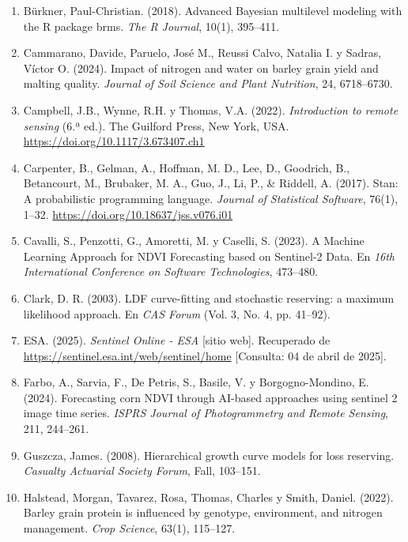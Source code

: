 \documentclass[
11pt, %
]{charter}
\begin{document}
\begin{enumerate}
    \item Bürkner, Paul-Christian. (2018). Advanced Bayesian multilevel modeling with the R package brms. \emph{The R Journal}, 10(1), 395–411.

    \item Cammarano, Davide, Paruelo, José M., Reussi Calvo, Natalia I. y Sadras, Víctor O. (2024). Impact of nitrogen and water on barley grain yield and malting quality. \emph{Journal of Soil Science and Plant Nutrition}, 24, 6718–6730.

    \item Campbell, J.B., Wynne, R.H. y Thomas, V.A. (2022). \emph{Introduction to remote sensing} (6.ª ed.). The Guilford Press, New York, USA. \url{https://doi.org/10.1117/3.673407.ch1}

    \item Carpenter, B., Gelman, A., Hoffman, M. D., Lee, D., Goodrich, B., Betancourt, M., Brubaker, M. A., Guo, J., Li, P., \& Riddell, A. (2017). Stan: A probabilistic programming language. \emph{Journal of Statistical Software}, 76(1), 1–32. \url{https://doi.org/10.18637/jss.v076.i01}

    \item Cavalli, S., Penzotti, G., Amoretti, M. y Caselli, S. (2023). A Machine Learning Approach for NDVI Forecasting based on Sentinel-2 Data. En \emph{16th International Conference on Software Technologies}, 473–480.

    \item Clark, D. R. (2003). LDF curve-fitting and stochastic reserving: a maximum likelihood approach. En \emph{CAS Forum} (Vol. 3, No. 4, pp. 41–92).

    \item ESA. (2025). \emph{Sentinel Online - ESA} [sitio web]. Recuperado de \url{https://sentinel.esa.int/web/sentinel/home} [Consulta: 04 de abril de 2025].

    \item Farbo, A., Sarvia, F., De Petris, S., Basile, V. y Borgogno-Mondino, E. (2024). Forecasting corn NDVI through AI-based approaches using sentinel 2 image time series. \emph{ISPRS Journal of Photogrammetry and Remote Sensing}, 211, 244–261.

    \item Guszcza, James. (2008). Hierarchical growth curve models for loss reserving. \emph{Casualty Actuarial Society Forum}, Fall, 103–151.

    \item Halstead, Morgan, Tavarez, Rosa, Thomas, Charles y Smith, Daniel. (2022). Barley grain protein is influenced by genotype, environment, and nitrogen management. \emph{Crop Science}, 63(1), 115–127.


\end{enumerate}
\end{document}
